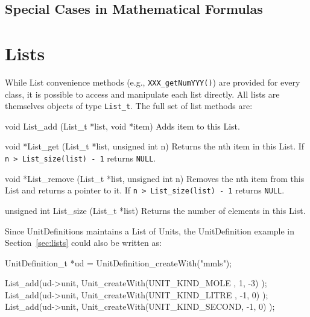 \documentclass{cekmanual}
\begin{document}
\subsection{Special Cases in Mathematical Formulas}
\label{sec:mathml-special-cases}





\clearpage
\appendix
\section{Lists}
\label{app:lists}

While List convenience methods (e.g., \texttt{XXX\_getNumYYY()}) are
provided for every class, it is possible to access and manipulate each
list directly.  All lists are themselves objects of type
\texttt{List\_t}.  The full set of list methods are:


\begin{methoddef}{void List\_add (List\_t *list, void *item)}
  Adds item to this List.
\end{methoddef}

\begin{methoddef}{void *List\_get (List\_t *list, unsigned int n)}
  Returns the nth item in this List.  If \texttt{n > List\_size(list)
  - 1} returns \texttt{NULL}.
\end{methoddef}

\begin{methoddef}{void *List\_remove (List\_t *list, unsigned int n)}
  Removes the nth item from this List and returns a pointer to it.  If
  \texttt{n > List\_size(list) - 1} returns \texttt{NULL}.
\end{methoddef}

\begin{methoddef}{unsigned int List\_size (List\_t *list)}
  Returns the number of elements in this List.
\end{methoddef}


Since UnitDefinitions maintains a List of Units, the UnitDefinition
example in Section~\ref{sec:lists} could also be written as:


\begin{example}[c]
UnitDefinition_t *ud = UnitDefinition_createWith("mmls");

List_add(ud->unit, Unit_createWith(UNIT_KIND_MOLE  ,  1, -3) );
List_add(ud->unit, Unit_createWith(UNIT_KIND_LITRE , -1,  0) );
List_add(ud->unit, Unit_createWith(UNIT_KIND_SECOND, -1,  0) );
\end{example}
\end{document}
